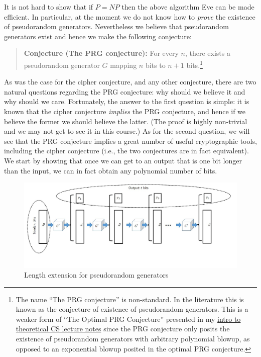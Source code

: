 It is not hard to show that if \(P=\ensuremath{\mathit{NP}}\) then the
above algorithm Eve can be made efficient. In particular, at the moment
we do not know how to \emph{prove} the existence of pseudorandom
generators. Nevertheless we believe that pseudorandom generators exist
and hence we make the following conjecture:

\begin{quote}
\textbf{Conjecture (The PRG conjecture):} For every \(n\), there exists
a pseudorandom generator \(G\) mapping \(n\) bits to \(n+1\)
bits.\footnote{The name ``The PRG conjecture'' is non-standard. In the
  literature this is known as the conjecture of existence of
  pseudorandom generators. This is a weaker form of ``The Optimal PRG
  Conjecture'' presented in my \href{https://goo.gl/G7bU4M}{intro to
  theoretical CS lecture notes} since the PRG conjecture only posits the
  existence of pseudorandom generators with arbitrary polynomial blowup,
  as opposed to an exponential blowup posited in the optimal PRG
  conjecture.}
\end{quote}

As was the case for the cipher conjecture, and any other conjecture,
there are two natural questions regarding the PRG conjecture: why should
we believe it and why should we care. Fortunately, the answer to the
first question is simple: it is known that the cipher conjecture
\emph{implies} the PRG conjecture, and hence if we believe the former we
should believe the latter. (The proof is highly non-trivial and we may
not get to see it in this course.) As for the second question, we will
see that the PRG conjecture implies a great number of useful
cryptographic tools, including the cipher conjecture (i.e., the two
conjectures are in fact equivalent). We start by showing that once we
can get to an output that is one bit longer than the input, we can in
fact obtain any polynomial number of bits.

\hypertarget{lengthextendprgthm}{}


\begin{figure}
\centering
\includegraphics[width=\textwidth, height=0.25\paperheight, keepaspectratio]{../figure/length-extension-prg.jpg}
\caption{Length extension for pseudorandom generators}
\label{lengthextendprgfig}
\end{figure}

